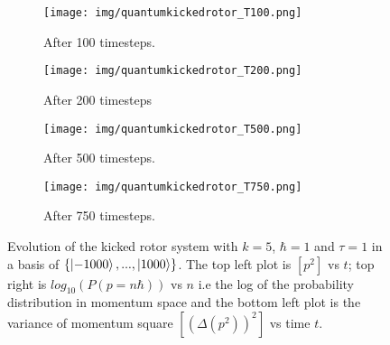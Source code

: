 \documentclass[twocolumn]{report}
\begin{document}
\newpage
\onecolumn
\begin{figure}[H]
    \centering
    \begin{subfigure}[b]{0.5 \textwidth}
        \centering
        \texttt{[image: img/quantumkickedrotor\_T100.png]}
        \caption{After 100 timesteps.}
    \end{subfigure}%
    \begin{subfigure}[b]{0.5 \textwidth}
        \centering
        \texttt{[image: img/quantumkickedrotor\_T200.png]}
        \caption{After 200 timesteps}
    \end{subfigure}%
    \newline
    \begin{subfigure}[b]{0.5 \textwidth}
        \centering
        \texttt{[image: img/quantumkickedrotor\_T500.png]}
        \caption{After 500 timesteps.}
    \end{subfigure}%
    \begin{subfigure}[b]{0.5 \textwidth}
        \centering
        \texttt{[image: img/quantumkickedrotor\_T750.png]}
        \caption{After 750 timesteps.}
    \end{subfigure}
    \caption{Evolution of the kicked rotor system with $k = 5$, $\hbar = 1$
and $\tau = 1$ in a basis of $\{\ket{-1000},...,\ket{1000}\}$. The top
left plot is $[p^2]$ vs $t$; top right is $log_{10}(P(p = n\hbar))$ vs
$n$ i.e the log of the probability distribution in momentum space and the
bottom left plot is the variance of momentum square $[(\Delta(p^2))^2]$ vs
time $t$.}
    \label{fig:kickedrotorplot}
\end{figure}
\end{document}
